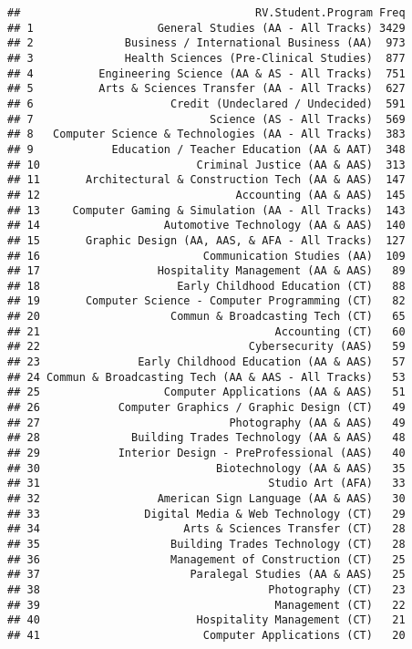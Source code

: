 \documentclass[]{article}
\begin{document}
\begin{verbatim}
##                                    RV.Student.Program Freq
## 1                   General Studies (AA - All Tracks) 3429
## 2              Business / International Business (AA)  973
## 3              Health Sciences (Pre-Clinical Studies)  877
## 4          Engineering Science (AA & AS - All Tracks)  751
## 5          Arts & Sciences Transfer (AA - All Tracks)  627
## 6                     Credit (Undeclared / Undecided)  591
## 7                           Science (AS - All Tracks)  569
## 8   Computer Science & Technologies (AA - All Tracks)  383
## 9            Education / Teacher Education (AA & AAT)  348
## 10                        Criminal Justice (AA & AAS)  313
## 11       Architectural & Construction Tech (AA & AAS)  147
## 12                              Accounting (AA & AAS)  145
## 13     Computer Gaming & Simulation (AA - All Tracks)  143
## 14                   Automotive Technology (AA & AAS)  140
## 15       Graphic Design (AA, AAS, & AFA - All Tracks)  127
## 16                         Communication Studies (AA)  109
## 17                  Hospitality Management (AA & AAS)   89
## 18                     Early Childhood Education (CT)   88
## 19       Computer Science - Computer Programming (CT)   82
## 20                    Commun & Broadcasting Tech (CT)   65
## 21                                    Accounting (CT)   60
## 22                                Cybersecurity (AAS)   59
## 23               Early Childhood Education (AA & AAS)   57
## 24 Commun & Broadcasting Tech (AA & AAS - All Tracks)   53
## 25                   Computer Applications (AA & AAS)   51
## 26            Computer Graphics / Graphic Design (CT)   49
## 27                             Photography (AA & AAS)   49
## 28              Building Trades Technology (AA & AAS)   48
## 29            Interior Design - PreProfessional (AAS)   40
## 30                           Biotechnology (AA & AAS)   35
## 31                                   Studio Art (AFA)   33
## 32                  American Sign Language (AA & AAS)   30
## 33                Digital Media & Web Technology (CT)   29
## 34                      Arts & Sciences Transfer (CT)   28
## 35                    Building Trades Technology (CT)   28
## 36                    Management of Construction (CT)   25
## 37                       Paralegal Studies (AA & AAS)   25
## 38                                   Photography (CT)   23
## 39                                    Management (CT)   22
## 40                        Hospitality Management (CT)   21
## 41                         Computer Applications (CT)   20

\end{verbatim}
\end{document}
